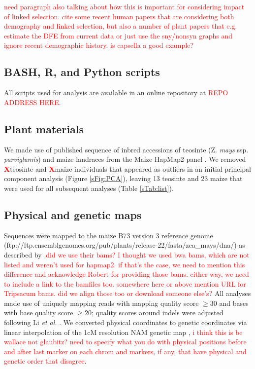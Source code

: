 \documentclass{pnastwo}
\newcommand{\jri}[1]{\textcolor{red}{\scriptsize #1}}
\newcommand{\X}{\textcolor{red}{\bf X}}
\begin{document}
\begin{article}
\jri{need paragraph also talking about how this is important for considering impact of linked selection. cite some recent human papers that are considering both demography and linked selection, but also a number of plant papers that e.g. estimate the DFE from current data or just use the sny/nonsyn graphs and ignore recent demographic history. is capsella a good example? }

\begin{materials}

  \subsection{BASH, R, and Python scripts}
All scripts used for analysis are available in an online repository at \textcolor{red}{REPO ADDRESS HERE.} 

\subsection{Plant materials}
We made use of published sequence of inbred accessions of teosinte (Z. \emph{mays} ssp. \emph{parviglumis}) and maize landraces from the Maize HapMap2 panel \cite{chia2012, lemmon2014}. 
We removed \X teosinte and \X maize individuals that appeared as outliers in an initial principal component analysis  (Figure \ref{sFig:PCA}), leaving 13 teosinte and 23 maize that were used for all subsequent analyses (Table \ref{sTab:list}).

\subsection{Physical and genetic maps}
Sequences were mapped to the maize B73 version 3 reference genome \cite{schnable2009} (ftp://ftp.ensemblgenomes.org/pub/plants/release-22/fasta/zea\_mays/dna/) as described by \cite{chia2012}.\jri{did we use their bams? I thought we used bwa bams, which are not listed and weren't used for hapmap2. if that's the case, we need to mention this difference and acknowledge Robert for providing those bams. either way, we need to include a link to the bamfiles too. somewhere here or above mention URL for Tripsacum bams. did we align those too or download someone else's?}
All analyses made use of uniquely mapping reads with mapping quality score $\geq  30$ and bases with base quality score $\geq 20$; quality scores around indels were adjusted following Li \emph{et al.} \cite{li2011statistical}.
We converted physical coordinates to genetic coordinates via linear interpolation of the 1cM resolution NAM genetic map \cite{glaubitz2014}, \jri{i think this is be wallace not glaubitz? need to specify what you do with physical positions before and after last marker on each chrom and markers, if any, that have physical and genetic order that disagree}.


\end{materials}
\end{article}
\end{document}
